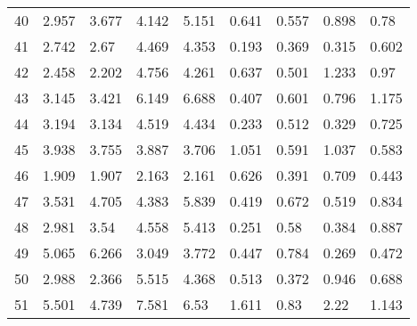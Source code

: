 \begin{longtable}{|l|l|l|l|l|l|l|l|l|}
        40 & 2.957 & 3.677 & 4.142 & 5.151 & 0.641 & 0.557 & 0.898 & 0.78 \\ 
        41 & 2.742 & 2.67 & 4.469 & 4.353 & 0.193 & 0.369 & 0.315 & 0.602 \\ 
        42 & 2.458 & 2.202 & 4.756 & 4.261 & 0.637 & 0.501 & 1.233 & 0.97 \\ 
        43 & 3.145 & 3.421 & 6.149 & 6.688 & 0.407 & 0.601 & 0.796 & 1.175 \\ 
        44 & 3.194 & 3.134 & 4.519 & 4.434 & 0.233 & 0.512 & 0.329 & 0.725 \\ 
        45 & 3.938 & 3.755 & 3.887 & 3.706 & 1.051 & 0.591 & 1.037 & 0.583 \\ 
        46 & 1.909 & 1.907 & 2.163 & 2.161 & 0.626 & 0.391 & 0.709 & 0.443 \\ 
        47 & 3.531 & 4.705 & 4.383 & 5.839 & 0.419 & 0.672 & 0.519 & 0.834 \\ 
        48 & 2.981 & 3.54 & 4.558 & 5.413 & 0.251 & 0.58 & 0.384 & 0.887 \\ 
        49 & 5.065 & 6.266 & 3.049 & 3.772 & 0.447 & 0.784 & 0.269 & 0.472 \\ 
        50 & 2.988 & 2.366 & 5.515 & 4.368 & 0.513 & 0.372 & 0.946 & 0.688 \\ 
        51 & 5.501 & 4.739 & 7.581 & 6.53 & 1.611 & 0.83 & 2.22 & 1.143 \\ \hline
\end{longtable}